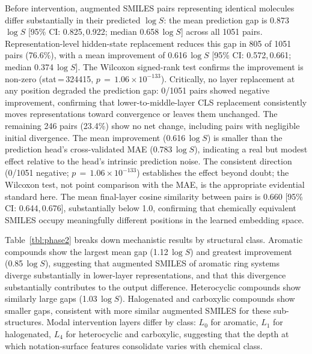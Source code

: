 \documentclass[twoside,twocolumn,9pt]{article}
\newcommand{\logS}{\ensuremath{\log S}}
\begin{document}
Before intervention, augmented SMILES pairs representing identical molecules differ substantially in their predicted $\logS$: the mean prediction gap is 0.873\,$\logS$ [95\% CI: 0.825,\,0.922; median 0.658\,$\logS$] across all 1051 pairs. Representation-level hidden-state replacement reduces this gap in 805 of 1051 pairs (76.6\%), with a mean improvement of 0.616\,$\logS$ [95\% CI: 0.572,\,0.661; median 0.374\,$\logS$]. The Wilcoxon signed-rank test confirms the improvement is non-zero (stat\,=\,324415, $p\,=\,1.06\!\times\!10^{-133}$). Critically, no layer replacement at any position degraded the prediction gap: 0/1051 pairs showed negative improvement, confirming that lower-to-middle-layer CLS replacement consistently moves representations toward convergence or leaves them unchanged. The remaining 246 pairs (23.4\%) show no net change, including pairs with negligible initial divergence. The mean improvement (0.616\,$\logS$) is smaller than the prediction head's cross-validated MAE (0.783\,$\logS$), indicating a real but modest effect relative to the head's intrinsic prediction noise. The consistent direction (0/1051 negative; $p\,=\,1.06\!\times\!10^{-133}$) establishes the effect beyond doubt; the Wilcoxon test, not point comparison with the MAE, is the appropriate evidential standard here. The mean final-layer cosine similarity between pairs is 0.660 [95\% CI: 0.644,\,0.676], substantially below 1.0, confirming that chemically equivalent SMILES occupy meaningfully different positions in the learned embedding space.

Table~\ref{tbl:phase2} breaks down mechanistic results by structural class. Aromatic compounds show the largest mean gap (1.12\,$\logS$) and greatest improvement (0.85\,$\logS$), suggesting that augmented SMILES of aromatic ring systems diverge substantially in lower-layer representations, and that this divergence substantially contributes to the output difference. Heterocyclic compounds show similarly large gaps (1.03\,$\logS$). Halogenated and carboxylic compounds show smaller gaps, consistent with more similar augmented SMILES for these sub-structures. Modal intervention layers differ by class: $L_0$ for aromatic, $L_1$ for halogenated, $L_4$ for heterocyclic and carboxylic, suggesting that the depth at which notation-surface features consolidate varies with chemical class.
\end{document}
